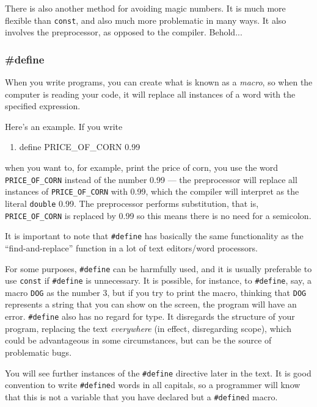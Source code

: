 There is also another method for avoiding magic numbers. It is much more
flexible than \texttt{const}, and also much more problematic in many ways. It
also involves the preprocessor, as opposed to the compiler. Behold...

\subsubsection{\#define}
When you write programs, you can create what is known as a \emph{macro}, so
when the computer is reading your code, it will replace all instances of a word
with the specified expression.

Here's an example. If you write
\begin{enumerate}
\setlength{\leftmargin}{0pt}
\setlength{\itemsep}{0pt}
\setlength{\parsep}{0pt}
\setlength{\parskip}{0pt}
	\item define PRICE\_OF\_CORN 0.99
\end{enumerate}

when you want to, for example, print the price of corn, you use the word
\texttt{PRICE\_OF\_CORN} instead of the number 0.99 --- the preprocessor will
replace all instances of \texttt{PRICE\_OF\_CORN} with 0.99, which the compiler
will interpret as the literal \texttt{double} 0.99. The preprocessor performs
substitution, that is, \texttt{PRICE\_OF\_CORN} is replaced by 0.99 so this
means there is no need for a semicolon.

It is important to note that \texttt{\#define} has basically the same
functionality as the ``find-and-replace'' function in a lot of text
editors/word processors. 

For some purposes, \texttt{\#define} can be harmfully used, and it is usually
preferable to use \texttt{const} if \texttt{\#define} is unnecessary. It is
possible, for instance, to \texttt{\#define}, say, a macro \texttt{DOG} as the
number 3, but if you try to print the macro, thinking that \texttt{DOG}
represents a string that you can show on the screen, the program will have an
error. \texttt{\#define} also has no regard for type. It disregards the
structure of your program, replacing the text \emph{everywhere} (in effect,
disregarding scope), which could be advantageous in some circumstances, but can
be the source of problematic bugs.

You will see further instances of the \texttt{\#define} directive later in the
text. It is good convention to write \texttt{\#define}d words in all capitals,
so a programmer will know that this is not a variable that you have declared
but a \texttt{\#define}d macro.

